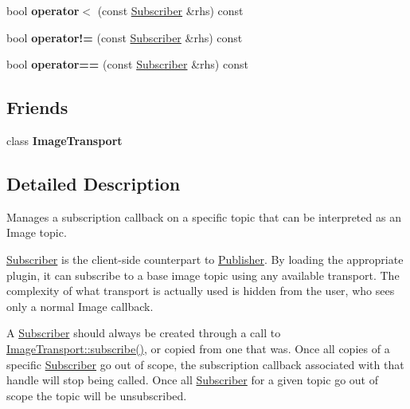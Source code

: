 \begin{DoxyCompactItemize}
\item 
\hypertarget{classimage__transport_1_1_subscriber_aec02fe5a92183fb63e94b0c70739d363}{bool {\bfseries operator$<$} (const \hyperlink{classimage__transport_1_1_subscriber}{Subscriber} \&rhs) const }\label{classimage__transport_1_1_subscriber_aec02fe5a92183fb63e94b0c70739d363}

\item 
\hypertarget{classimage__transport_1_1_subscriber_a30e373deed0ab800184c5d2c7bac2dba}{bool {\bfseries operator!=} (const \hyperlink{classimage__transport_1_1_subscriber}{Subscriber} \&rhs) const }\label{classimage__transport_1_1_subscriber_a30e373deed0ab800184c5d2c7bac2dba}

\item 
\hypertarget{classimage__transport_1_1_subscriber_a6428c74a8fc9cabcac2e9f11c50f25cf}{bool {\bfseries operator==} (const \hyperlink{classimage__transport_1_1_subscriber}{Subscriber} \&rhs) const }\label{classimage__transport_1_1_subscriber_a6428c74a8fc9cabcac2e9f11c50f25cf}

\end{DoxyCompactItemize}
\subsection*{Friends}
\begin{DoxyCompactItemize}
\item 
\hypertarget{classimage__transport_1_1_subscriber_ac010f5a40d98825199e1c5303d0638eb}{class {\bfseries Image\-Transport}}\label{classimage__transport_1_1_subscriber_ac010f5a40d98825199e1c5303d0638eb}

\end{DoxyCompactItemize}


\subsection{Detailed Description}
Manages a subscription callback on a specific topic that can be interpreted as an Image topic. 

\hyperlink{classimage__transport_1_1_subscriber}{Subscriber} is the client-\/side counterpart to \hyperlink{classimage__transport_1_1_publisher}{Publisher}. By loading the appropriate plugin, it can subscribe to a base image topic using any available transport. The complexity of what transport is actually used is hidden from the user, who sees only a normal Image callback.

A \hyperlink{classimage__transport_1_1_subscriber}{Subscriber} should always be created through a call to \hyperlink{classimage__transport_1_1_image_transport_a1c847a2c719c874f84a78a6a60b98c7f}{Image\-Transport\-::subscribe()}, or copied from one that was. Once all copies of a specific \hyperlink{classimage__transport_1_1_subscriber}{Subscriber} go out of scope, the subscription callback associated with that handle will stop being called. Once all \hyperlink{classimage__transport_1_1_subscriber}{Subscriber} for a given topic go out of scope the topic will be unsubscribed. 

